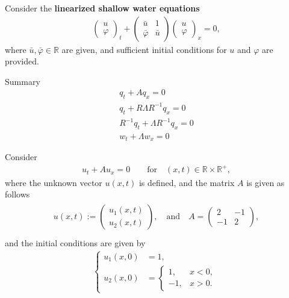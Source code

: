 \documentclass[12pt]{article}
\begin{document}
\begin{example}
	Consider the \textbf{linearized shallow water equations}
	\begin{align}
		\begin{pmatrix} u\\ \varphi\end{pmatrix}_{t}
		+
		\begin{pmatrix} \bar{u} & 1 \\ \bar{\varphi} & \bar{u} \end{pmatrix}
		\begin{pmatrix} u \\ \varphi\end{pmatrix}_{x}
		= 0,
	\end{align}
	where $\bar{u}, \bar{\varphi} \in \mathbb{R}$ are given, 
	and sufficient initial conditions for $u$ and $\varphi$ are provided.
\end{example}
Summary
\begin{equation*}
	\boxed{
		\begin{aligned}
			q_{t} + Aq_{x} = 0                     \\
			q_{t} + R\Lambda R^{-1}  q_{x} = 0     \\
			R^{-1}q_{t} + \Lambda R^{-1} q_{x} = 0 \\
			w_{t} + \Lambda w_{x} = 0                     
		\end{aligned}
	}
\end{equation*}
\clearpage
\begin{example}
	Consider
	\begin{align*}
		u_t + Au_x = 0 \qquad\text{for}\quad (x,t)\in \mathbb{R} \times \mathbb{R}^+,
	\end{align*}
	where the unknown vector $u(x,t)$ is defined, and the matrix $A$ is given as follows
	\begin{align*}
		\begin{array}{l}
			u(x, t) :=
			\begin{pmatrix} u_1(x,t) \\ u_2(x,t) \end{pmatrix},
			\quad\text{and}\quad
			A = \begin{pmatrix} 2 & -1 \\ -1 & 2 \end{pmatrix}, \\
		\end{array}
	\end{align*}
	and the initial conditions are given by
	\begin{align*}
		\begin{cases}
			u_1(x, 0) & = 1, \\
			u_2(x, 0) & =
			\begin{cases}
				1,  & x < 0, \\
				-1, & x > 0.
			\end{cases}
		\end{cases}
	\end{align*}
\end{example}
\end{document}
